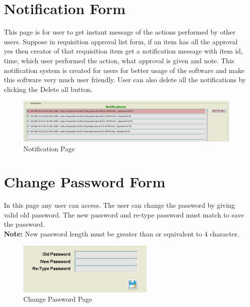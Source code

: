 \documentclass[12pt]{report} %
\begin{document}
\section{Notification Form}
This page is for user to get instant message of the actions performed by other users. Suppose in requisition approval list form, if an item has all the approval yes then creator of that requisition item get a notification message with item id, time, which user performed the action, what approval is given and note. This notification system is created for users for better usage of the software and make this software very much user friendly. User can also delete all the notifications by clicking the Delete all button.
\begin{figure}[h]
	\includegraphics[width=1\textwidth]{pic/notification.PNG}
	\caption{Notification Page}
	\label{fig:notification}
\end{figure}


\section{Change Password Form}
In this page any user can access. The user can change the password by giving valid old password. The new password and re-type password must match to save the password. \\
\textbf{Note:} New password length must be greater than or equivalent to 4 character.\\
\begin{figure}[h]
	\begin{center}
	\includegraphics[width=0.6\textwidth]{pic/change_pass.PNG}
	\end{center}
	\caption{Change Password Page}
	\label{fig:change_pass}
\end{figure}
\end{document}
